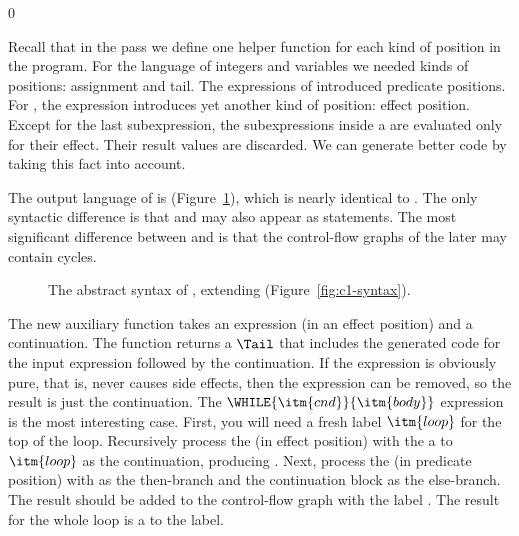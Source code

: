 \documentclass[7x10]{TimesAPriori_MIT}%
\newcommand{\gray}[1]{{\color{gray} #1}}
\def\racketEd{0}
\def\edition{1}
\begin{document}
{\if\edition\racketEd

Recall that in the  pass we define one helper
function for each kind of position in the program.  For the \LangVar{}
language of integers and variables we needed kinds of positions:
assignment and tail. The  expressions of \LangIf{} introduced
predicate positions. For \LangLoop{}, the  expression introduces
yet another kind of position: effect position. Except for the last
subexpression, the subexpressions inside a  are evaluated
only for their effect. Their result values are discarded. We can
generate better code by taking this fact into account.

The output language of  is \LangCLoop{}
(Figure~\ref{fig:c7-syntax}), which is nearly identical to
\LangCLam{}. The only syntactic difference is that  and
 may also appear as statements.  The most significant
difference between \LangCLam{} and \LangCLoop{} is that the
control-flow graphs of the later may contain cycles.


\begin{figure}[tp]
\fbox{
\begin{minipage}{0.96\textwidth}
\small
\[
\begin{array}{lcl}
\Stmt &::=& \gray{ \ASSIGN{\VAR{\Var}}{\Exp} } 
     \MID \READ{}\\
\Def &::=& \DEF{\itm{label}}{\LP\LS\Var\key{:}\Type\RS\ldots\RP}{\Type}{\itm{info}}{\LP\LP\itm{label}\,\key{.}\,\Tail\RP\ldots\RP}\\
\LangCLoopM{} & ::= & \CPROGRAM{\itm{info}}{\LP\LP\itm{label}\,\key{.}\,\Tail\RP\ldots\RP}
\end{array}
\]
\end{minipage}
}
\caption{The abstract syntax of \LangCLoop{}, extending \LangCIf{} (Figure~\ref{fig:c1-syntax}).}
\label{fig:c7-syntax}
\end{figure}

The new auxiliary function  takes an
expression (in an effect position) and a continuation. The function
returns a $\Tail$ that includes the generated code for the input
expression followed by the continuation. If the expression is
obviously pure, that is, never causes side effects, then the
expression can be removed, so the result is just the continuation.
%
The $\WHILE{\itm{cnd}}{\itm{body}}$ expression is the most interesting
case.  First, you will need a fresh label $\itm{loop}$ for the top of
the loop.  Recursively process the  (in effect position)
with the a  to $\itm{loop}$ as the continuation, producing
. Next, process the  (in predicate position) with
 as the then-branch and the continuation block as the
else-branch. The result should be added to the control-flow graph with
the label . The result for the whole  loop is a
 to the  label.

}
\end{document}
